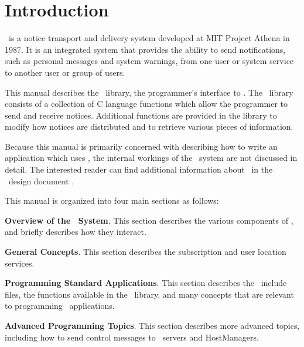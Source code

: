 %
\section{Introduction}
\label{introduction}

\Zephyr\ is a notice transport and delivery system developed at MIT
Project Athena in 1987.  It is an integrated system that provides the
ability to send notifications, such as personal messages and system
warnings, from one user or system service to another user or group of
users.

This manual describes the \Zephyr\ library, the programmer's interface
to \Zephyr.  The \Zephyr\ library consists of a collection of C
language functions which allow the programmer to send and receive
notices.  Additional functions are provided in the library to modify
how notices are distributed and to retrieve various pieces of
information.

Because this manual is primarily concerned with describing how to
write an application which uses \Zephyr, the internal workings of the
\Zephyr\ system are not discussed in detail.  The interested reader
can find additional information about \Zephyr\ in the \Zephyr\ design
document \cite{zephyr-design}.

This manual is organized into four main sections as follows:

\begin{description}
\item {\bf Overview of the \Zephyr\ System}.  This
section describes the various components of \Zephyr, and briefly
describes how they interact.

\item {\bf General Concepts}.  This
section describes the subscription and user location services.

\item {\bf Programming Standard
Applications}.  This section describes the \Zephyr\ include files,
the functions available in the \Zephyr\ library, and many concepts
that are relevant to programming \Zephyr\ applications.

\item {\bf Advanced Programming
Topics}.  This section describes more advanced topics, including how
to send control messages to \Zephyr\ servers and HostManagers.
\end{description}

